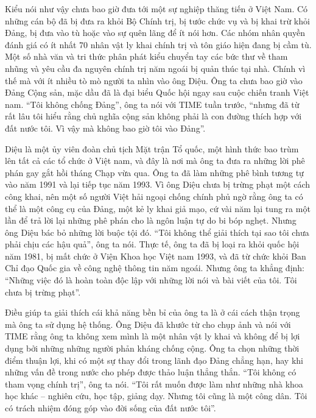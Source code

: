     Kiểu nói như vậy chưa bao giờ đưa tới một sự nghiệp thăng tiến ở Việt Nam. Có những cán bộ đã bị đưa ra khỏi Bộ Chính trị, bị tước chức vụ và bị khai trừ khỏi Đảng, bị đưa vào tù hoặc vào sự quên lãng để ít nói hơn. Các nhóm nhân quyền đánh giá có ít nhất 70 nhân vật ly khai chính trị và tôn giáo hiện đang bị cầm tù. Một số nhà văn và tri thức phân phát kiểu chuyển tay các bức thư về tham nhũng và yêu cầu đa nguyên chính trị năm ngoái bị quản thúc tại nhà. Chính vì thế mà với ít nhiều tò mò người ta nhìn vào ông Diệu. Ông ta chưa bao giờ vào Đảng Cộng sản, mặc dầu đã là đại biểu Quốc hội ngay sau cuộc chiến tranh Việt nam. “Tôi không chống Đảng”, ông ta nói với TIME tuần trước, “nhưng đã từ rất lâu tôi hiểu rằng chủ nghĩa cộng sản không phải là con đường thích hợp với đất nước tôi. Vì vậy mà không bao giờ tôi vào Đảng”.
    
    Diệu là một ủy viên đoàn chủ tịch Mặt trận Tổ quốc, một hình thức bao trùm lên tất cả các tổ chức ở Việt nam, và đây là nơi mà ông ta đưa ra những lời phê phán gay gắt hồi tháng Chạp vừa qua. Ông ta đã làm những phê bình tương tự vào năm 1991 và lại tiếp tục năm 1993. Vì ông Diệu chưa bị trừng phạt một cách công khai, nên một số người Việt hải ngoại chống chính phủ ngờ rằng ông ta có thể là một công cụ của Đảng, một kẻ ly khai giả mạo, cứ vài năm lại tung ra một lần để trả lời lại những phê phán cho là ngôn luận tự do bi bóp nghẹt. Nhưng ông Diệu bác bỏ những lời buộc tội đó. “Tôi không thể giải thích tại sao tôi chưa phải chịu các hậu quả”, ông ta nói. Thực tế, ông ta đã bị loại ra khỏi quốc hội năm 1981, bị mất chức ở Viện Khoa học Việt  nam 1993, và đã từ chức khỏi Ban Chỉ đạo Quốc gia về công nghệ thông tin năm ngoái. Nhưng ông ta khẳng định: “Những việc đó là hoàn toàn độc lập với những lời nói và bài viết của tôi. Tôi chưa bị trừng phạt”.
    
    Điều giúp ta giải thích cái khả năng bền bỉ của ông ta là ở cái cách thận trọng mà ông ta sử dụng hệ thống. Ông Diệu đã khước từ cho chụp ảnh và nói với TIME rằng ông ta không xem mình là một nhân vật ly khai và không để bị lợi dụng bởi những những người phản kháng chống cộng. Ông ta chọn những thời điểm thuận lợi, khi có một sự thay đổi trong lãnh đạo Đảng chẳng hạn, hay khi những vấn đề trong nước cho phép được thảo luận thẳng thắn. “Tôi không có tham vọng chính trị”, ông ta nói. “Tôi rất muốn được làm như những nhà khoa học khác – nghiên cứu, học tập, giảng dạy. Nhưng tôi cũng là một công dân. Tôi có trách nhiệm đóng góp vào đời sống của đất nước tôi”.

